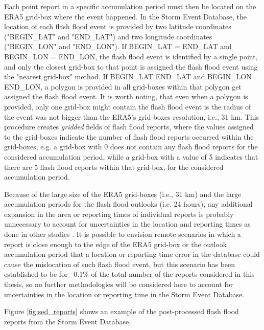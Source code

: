 Each point report in a specific accumulation period must then be located on the ERA5 grid-box where the event happened. In the Storm Event Database, the location of each flash flood event is provided by two latitude coordinates ("BEGIN\_LAT" and "END\_LAT") and two longitude coordinates ("BEGIN\_LON" and "END\_LON"). If BEGIN\_LAT = END\_LAT and BEGIN\_LON = END\_LON, the flash flood event is identified by a single point, and only the closest grid-box to that point is assigned the flash flood event using the "nearest grid-box" method. If BEGIN\_LAT \ne END\_LAT and BEGIN\_LON \ne END\_LON, a polygon is provided in all grid-boxes within that polygon get assigned the flash flood event. It is worth noting, that even when a polygon is provided, only one grid-box might contain the flash flood event is the radius of the event was not bigger than the ERA5's grid-boxes resolution, i.e., 31 km. This procedure creates \textit{gridded} fields of flash flood reports, where the values assigned to the grid-boxes indicate the number of flash flood reports occurred within the grid-boxes, e.g. a grid-box with 0 does not contain any flash flood reports for the considered accumulation period, while a grid-box with a value of 5 indicates that there are 5 flash flood reports within that grid-box, for the considered accumulation period.

Because of the large size of the ERA5 grid-boxes (i.e., 31 km) and the large accumulation periods for the flash flood outlooks (i.e. 24 hours), any additional expansion in the area or reporting times of individual reports is probably unnecessary to account for uncertainties in the location and reporting times as done in other studies \citep{Cavaiola_2024}. It is possible to envision remote scenarios in which a report is close enough to the edge of the ERA5 grid-box or the outlook accumulation period that a location or reporting time error in the database could cause the mislocation of such flash flood event, but this scenario has been established to be for ~0.1\% of the total number of the reports considered in this thesis, so no further methodologies will be considered here to account for uncertainties in the location or reporting time in the Storm Event Database. 

Figure \ref{fig:sed_reports} shows an example of the post-processed flash flood reports from the Storm Event Database.

